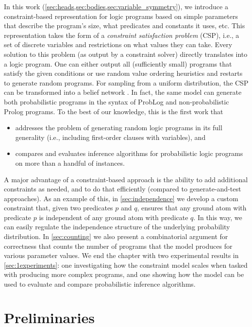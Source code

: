 In this work (\cref{sec:heads,sec:bodies,sec:variable_symmetry}), we introduce a
constraint-based representation for logic programs based on simple parameters
that describe the program's size, what predicates and constants it uses, etc.
This representation takes the form of a \emph{constraint satisfaction problem}
(CSP), i.e., a set of discrete variables and restrictions on what values they
can take. Every solution to this problem (as output by a constraint solver)
directly translates into a logic program. One can either output all
(sufficiently small) programs that satisfy the given conditions or use random
value ordering heuristics and restarts to generate random programs. For sampling
from a uniform distribution, the CSP can be transformed into a belief network
\citep{DBLP:conf/aaai/DechterKBE02}. In fact, the same model can generate both
probabilistic programs in the syntax of ProbLog
\citep{DBLP:conf/ijcai/RaedtKT07} and non-probabilistic Prolog programs. To the
best of our knowledge, this is the first work that
\begin{itemize}
\item addresses the problem of generating random logic programs in its full
  generality (i.e., including first-order clauses with variables), and
\item compares and evaluates inference algorithms for probabilistic logic
  programs on more than a handful of instances.
\end{itemize}

A major advantage of a constraint-based approach is the ability to add
additional constraints as needed, and to do that efficiently (compared to
generate-and-test approaches). As an example of this, in \cref{sec:independence}
we develop a custom constraint that, given two predicates $p$ and $q$, ensures
that any ground atom with predicate $p$ is independent of any ground atom with
predicate $q$. In this way, we can easily regulate the independence structure of
the underlying probability distribution. In \cref{sec:counting} we also present
a combinatorial argument for correctness that counts the number of programs that
the model produces for various parameter values. We end the chapter with two
experimental results in \cref{sec:1experiments}: one investigating how the
constraint model scales when tasked with producing more complex programs, and
one showing how the model can be used to evaluate and compare probabilistic
inference algorithms.

\section{Preliminaries}

